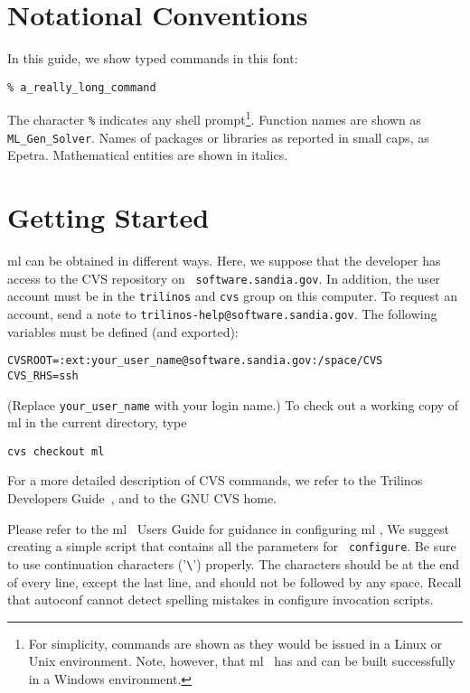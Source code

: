 \documentclass[10pt,letter,relax]{SANDreport}
\newcommand{\ML}     {{\sc ml }}
\begin{document}

\section{Notational Conventions}

In this guide, we show typed commands in this font:
\begin{verbatim}
% a_really_long_command
\end{verbatim}
The character \verb!%! indicates any shell prompt\footnote{For
  simplicity, commands are shown as they would be issued in a Linux or
  Unix environment.  Note, however, that \ML\ has and can be built
  successfully in a Windows environment.}.
Function names are shown as {\tt ML\_Gen\_Solver}.  Names of packages or
libraries as reported in small caps, as {\sc Epetra}. Mathematical
entities are shown in italics.


\section{Getting Started}
\label{sec:started}

\ML can be obtained in different ways. Here, we suppose that the
developer has access to the CVS repository on {\tt
  software.sandia.gov}. In addition, the user account must be in the
{\tt trilinos} and {\tt cvs} group on this computer. To request an
account, send a note to {\tt trilinos-help@software.sandia.gov}.  The
following variables must be defined (and exported):
\begin{verbatim}
CVSROOT=:ext:your_user_name@software.sandia.gov:/space/CVS
CVS_RHS=ssh
\end{verbatim}
(Replace \verb!your_user_name! with your login name.) To check out a
working copy of \ML in the current directory, type
\begin{verbatim}
cvs checkout ml
\end{verbatim}
For a more detailed description of CVS commands, we refer to the
Trilinos Developers Guide~\cite{Trilinos-Dev-Guide}, and to the GNU CVS home.

Please refer to the \ML\ Users Guide for guidance in configuring \ML,
We suggest creating a simple script that contains all the parameters for {\tt
configure}. Be sure to use continuation characters ('\verb!\!') properly.
The characters should be at the end of every line, except the last line, and
should not be followed by any space.  Recall that autoconf cannot detect
spelling mistakes in configure invocation scripts.
\end{document}
